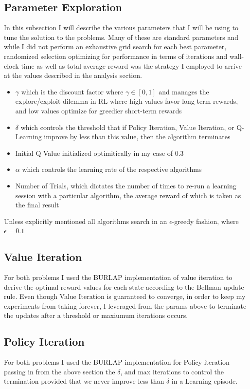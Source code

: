 \documentclass[11pt]{article}
\begin{document}
    \subsection{Parameter Exploration}\label{subsec:parameter-exploration}
    In this subsection I will describe the various parameters that I will be using to tune the solution to the problems.
    Many of these are standard parameters and while I did not perform an exhaustive grid search for each best parameter,
    randomized selection optimizing for performance in terms of iterations and wall-clock time as well as total average
    reward was the strategy I employed to arrive at the values described in the analysis section.
    \begin{itemize}
        \item $\gamma$ which is the discount factor where $\gamma \in [0,1]$ and manages the explore/exploit dilemma in RL where high values favor long-term rewards, and low values optimize for greedier short-term rewards
        \item $\delta$ which controls the threshold that if Policy Iteration, Value Iteration, or Q-Learning improve by less than this value, then the algorithm terminates
        \item Initial Q Value initialized optimitically in my case of 0.3
        \item $\alpha$ which controls the learning rate of the respective algorithms
        \item Number of Trials, which dictates the number of times to re-run a learning session with a particular algorithm, the average reward of which is taken as the final result
    \end{itemize}
    Unless explicitly mentioned all algorithms search in an $\epsilon$-greedy fashion, where $\epsilon = 0.1$

    \subsection{Value Iteration}
    For both problems I used the BURLAP implementation of value iteration to derive the optimal reward values for each state
    according to the Bellman update rule.
    Even though Value Iteration is guaranteed to converge, in order to keep my experiments from taking forever, I leveraged
    from the params above to terminate the updates after a threshold or maxiumum iterations occurs.

    \subsection{Policy Iteration}
    For both problems I used the BURLAP implementation for Policy iteration passing in from the above section the $\delta$,
    and max iterations to control the termination provided that we never improve less than $\delta$ in a Learning episode.
\end{document}
